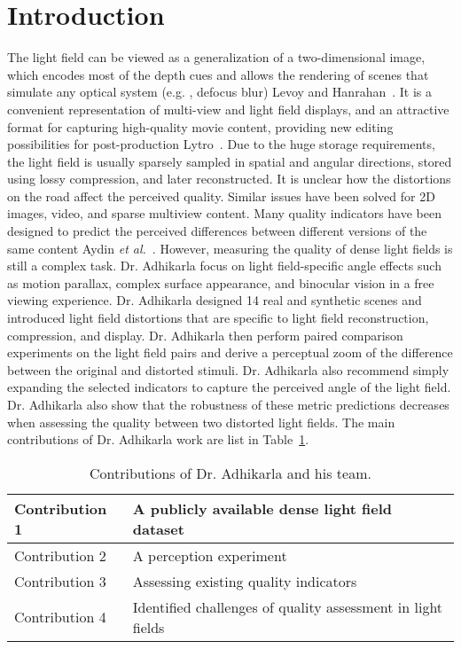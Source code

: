 \documentclass[10pt,twocolumn,letterpaper]{article}
\begin{document}
    \section{Introduction}
    The light field can be viewed as a generalization of a two-dimensional image, which encodes most of the depth cues and allows the rendering of scenes that simulate any optical system (e.g. , defocus blur) Levoy and Hanrahan~\cite{[16]}. It is a convenient representation of multi-view and light field displays, and an attractive format for capturing high-quality movie content, providing new editing possibilities for post-production Lytro~\cite{[19]}. Due to the huge storage requirements, the light field is usually sparsely sampled in spatial and angular directions, stored using lossy compression, and later reconstructed. It is unclear how the distortions on the road affect the perceived quality. Similar issues have been solved for 2D images, video, and sparse multiview content. Many quality indicators have been designed to predict the perceived differences between different versions of the same content Aydin \emph{et al.}~\cite{[1]}. However, measuring the quality of dense light fields is still a complex task. Dr. Adhikarla focus on light field-specific angle effects such as motion parallax, complex surface appearance, and binocular vision in a free viewing experience. Dr. Adhikarla designed 14 real and synthetic scenes and introduced light field distortions that are specific to light field reconstruction, compression, and display. Dr. Adhikarla then perform paired comparison experiments on the light field pairs and derive a perceptual zoom of the difference between the original and distorted stimuli. Dr. Adhikarla also recommend simply expanding the selected indicators to capture the perceived angle of the light field. Dr. Adhikarla also show that the robustness of these metric predictions decreases when assessing the quality between two distorted light fields. The main contributions of Dr. Adhikarla work are list in Table~\ref{Table1}.
    \begin{table}[hpbt]
            \centering
            \begin{tabular}{|l|l|}
            \hline
            Contribution 1 & A publicly available dense light field dataset \\
            \hline
            Contribution 2 & A perception experiment \\
            \hline
            Contribution 3 & Assessing existing quality indicators \\
            \hline
            Contribution 4 & Identified challenges of quality assessment in light fields \\
            \end{tabular}
            \caption{Contributions of Dr. Adhikarla and his team.}
            \label{Table1}
        \end{table}
        
\end{document}
